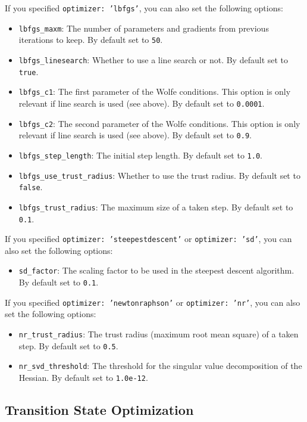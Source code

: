 \documentclass[]{tufte-book}
\begin{document}
If you specified \texttt{optimizer: 'lbfgs'}, you can also set the following options:
\begin{itemize}
\item \texttt{lbfgs\_maxm}: The number of parameters and gradients from previous iterations to keep. By default set to 
\texttt{50}.
\item \texttt{lbfgs\_linesearch}: Whether to use a line search or not. By default set to \texttt{true}.
\item \texttt{lbfgs\_c1}: The first parameter of the Wolfe conditions. This option is only relevant if line search is
used (see above). By default set to \texttt{0.0001}.
\item \texttt{lbfgs\_c2}:  The second parameter of the Wolfe conditions. This option is only relevant if line search is
used (see above). By default set to \texttt{0.9}.
\item \texttt{lbfgs\_step\_length}: The initial step length. By default set to \texttt{1.0}.
\item \texttt{lbfgs\_use\_trust\_radius}: Whether to use the trust radius. By default set to \texttt{false}.
\item \texttt{lbfgs\_trust\_radius}: The maximum size of a taken step. By default set to \texttt{0.1}.
\end{itemize}

If you specified \texttt{optimizer: 'steepestdescent'} or \texttt{optimizer: 'sd'}, you can also set the following options:
\begin{itemize}
\item \texttt{sd\_factor}: The scaling factor to be used in the steepest descent algorithm. By default set to \texttt{0.1}.
\end{itemize}

If you specified \texttt{optimizer: 'newtonraphson'} or \texttt{optimizer: 'nr'}, you can also set the following options:
\begin{itemize}
\item \texttt{nr\_trust\_radius}: The trust radius (maximum root mean square) of a taken step. By default set to \texttt{0.5}.
\item \texttt{nr\_svd\_threshold}: The threshold for the singular value decomposition of the Hessian. By default set to
\texttt{1.0e-12}.
\end{itemize}

\subsection{Transition State Optimization}
\end{document}
